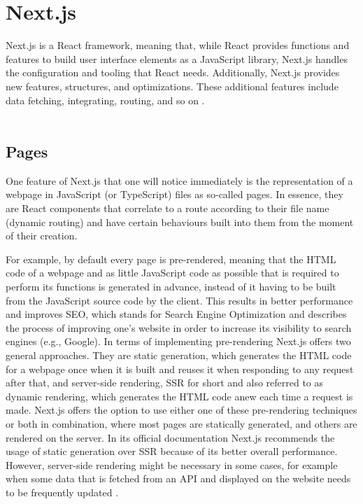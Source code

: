 \section{Next.js}
Next.js is a React framework, meaning that, while React provides functions and features to build user interface elements
as a JavaScript library, Next.js handles the configuration and tooling that React needs. Additionally, Next.js provides
new features, structures, and optimizations. These additional features include data fetching, integrating, routing,
and so on \cite{NextjsDescription}.
\\
\\
\subsection{Pages}
One feature of Next.js that one will notice immediately is the representation of a webpage in JavaScript (or TypeScript) files as
so-called pages. In essence, they are React components that correlate to a route according to their file name (dynamic routing) and
have certain behaviours built into them from the moment of their creation.

For example, by default every page is pre-rendered, meaning that the HTML code of a webpage and as little JavaScript code as possible
that is required to perform its functions is generated in advance, instead of it having to be built from the JavaScript source code by
the client. This results in better performance and improves SEO, which stands for Search Engine Optimization and describes the process
of improving one's website in order to increase its visibility to search engines (e.g., Google). In terms of implementing pre-rendering
Next.js offers two general approaches. They are static generation, which generates the HTML code for a webpage once when it is built
and reuses it when responding to any request after that, and server-side rendering, SSR for short and also referred to as dynamic
rendering, which generates the HTML code anew each time a request is made. Next.js offers the option to use either one of these pre-rendering
techniques or both in combination, where most pages are statically generated, and others are rendered on the server. In its official
documentation Next.js recommends the usage of static generation over SSR because of its better overall performance. However, server-side
rendering might be necessary in some cases, for example when some data that is fetched from an API and displayed on the website needs
to be frequently updated \cite{NextjsPages}.
\\
\\
